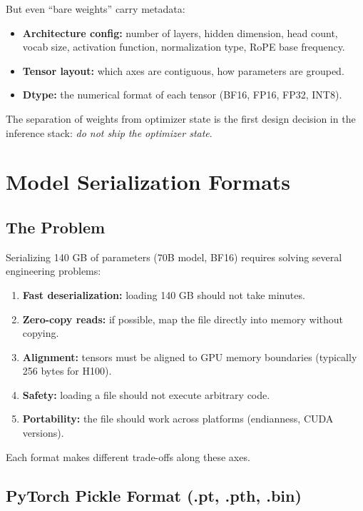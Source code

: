 \documentclass[11pt,a4paper]{article}
\theoremstyle{definition}
\begin{document}
But even ``bare weights'' carry metadata:
\begin{itemize}
	\item \textbf{Architecture config:} number of layers, hidden dimension, head count, vocab size, activation function, normalization type, RoPE base frequency.
	\item \textbf{Tensor layout:} which axes are contiguous, how parameters are grouped.
	\item \textbf{Dtype:} the numerical format of each tensor (BF16, FP16, FP32, INT8).
\end{itemize}

The separation of weights from optimizer state is the first design decision in the inference stack: \emph{do not ship the optimizer state}.

\section{Model Serialization Formats}
\label{sec:formats}

\subsection{The Problem}

Serializing 140 GB of parameters (70B model, BF16) requires solving several engineering problems:

\begin{enumerate}
	\item \textbf{Fast deserialization:} loading 140 GB should not take minutes.
	\item \textbf{Zero-copy reads:} if possible, map the file directly into memory without copying.
	\item \textbf{Alignment:} tensors must be aligned to GPU memory boundaries (typically 256 bytes for H100).
	\item \textbf{Safety:} loading a file should not execute arbitrary code.
	\item \textbf{Portability:} the file should work across platforms (endianness, CUDA versions).
\end{enumerate}

Each format makes different trade-offs along these axes.

\subsection{PyTorch Pickle Format (.pt, .pth, .bin)}
\end{document}
